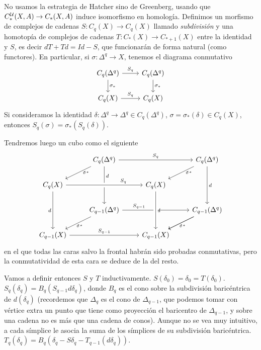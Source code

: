 \documentclass[TA.tex]{subfiles}
\begin{document}
\begin{dem}
No usamos la estrategia de Hatcher sino de Greenberg, usando que $C_*^{\mathcal{U}}(X,A)\to C_*(X,A)$ induce isomorfismo en homología. Definimos un morfismo de complejos de cadenas $S:C_q(X)\to C_q(X)$ llamado \emph{subdivisión} y una homotopía de complejos de cadenas $T:C_*(X)\to C_{*+1}(X)$ entre la identidad y $S$, es decir $dT+Td=Id-S$, que funcionarán de forma natural (como functores). En particular, si $\sigma:\Delta^q\to X$, tenemos el diagrama conmutativo
\[
\begin{tikzcd}
C_q(\Delta^q)\arrow[r, "S_q"]\arrow[d, "\sigma_*"] & C_q(\Delta^q)\arrow[d, "\sigma_*"]\\
C_q(X)\arrow[r, "S_q"] & C_q(X)
\end{tikzcd}
\] 
Si consideramos la identidad $\delta:\Delta^q\to\Delta^q\in C_q(\Delta^q)$, $\sigma=\sigma_*(\delta)\in C_q(X)$, entonces $S_q(\sigma)=\sigma_*(S_q(\delta))$. 

Tendremos luego un cubo como el siguiente 
\[
\begin{tikzcd}
&
C_q(\Delta^q)
\ar{dl}[swap, sloped, near start]{\sigma_*}
\ar{rr}{S_q}
\ar[]{dd}[near start]{d}
& & C_q(\Delta^q)
\ar{dd}{d}
\ar{dl}[swap, sloped, near start]{\sigma_*}
\\
C_q(X)
\ar[crossing over]{rr}[near end]{S_q}
\ar{dd}[swap]{d}
& & C_{q}(X)
\ar[crossing over]{dd}[]{d}
\\
&
C_{q-1}(\Delta^q)
\ar[near start]{rr}{S_{q-1}}
\ar[sloped, swap]{dl}{\sigma_*}
& & C_{q-1}(\Delta^q)
\ar[sloped, swap]{dl}{\sigma_*}
\ar{dl}
\\
C_{q-1}(X)
\ar{rr}{S_{q-1}}
& & C_{q-1}(X)
\ar[crossing over, leftarrow, near start]{uu}{}
\end{tikzcd}
\]
en el que todas las caras salvo la frontal habrán sido probadas conmutativas, pero la conmutatividad de esta cara se deduce de la del resto.

Vamos a definir entonces $S$ y $T$ inductivamente. $S(\delta_0)=\delta_0=T(\delta_0)$. $S_q(\delta_q)=B_q(S_{q-1}d\delta_q)$, donde $B_q$ es el cono sobre la subdivisión baricéntrica de $d(\delta_q)$ (recordemos que $\Delta_q$ es el cono de $\Delta_{q-1}$, que podemos tomar con vértice extra un punto que tiene como proyección el baricentro de $\Delta_{q-1}$, y sobre una cadena no es más que una cadena de conos). Aunque no se vea muy intuitivo, a cada símplice le asocia la suma de los símplices de su subdivisión baricéntrica. $T_q(\delta_q)=B_q(\delta_q-S\delta_q-T_{q-1}(d\delta_q))$.


\end{dem}
\end{document}
